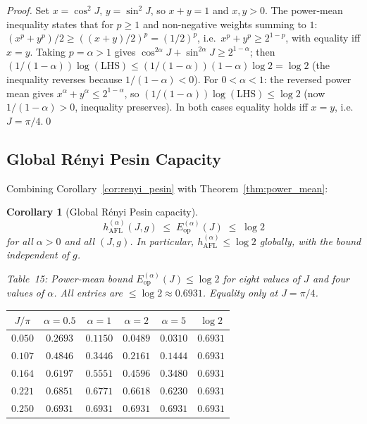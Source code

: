 \documentclass[12pt,a4paper]{article}
\newtheorem{corollary}[theorem]{Corollary}
\begin{document}
\begin{proof}
Set $x=\cos^2\!J$, $y=\sin^2\!J$, so $x+y=1$ and $x,y>0$.
The power-mean inequality states that for $p\ge 1$ and non-negative weights
summing to $1$:
$(x^p+y^p)/2 \ge ((x+y)/2)^p = (1/2)^p$, i.e.\ $x^p+y^p \ge 2^{1-p}$, with
equality iff $x=y$.  Taking $p=\alpha>1$ gives $\cos^{2\alpha}\!J+\sin^{2\alpha}\!J
\ge 2^{1-\alpha}$; then $(1/(1-\alpha))\log(\text{LHS}) \le (1/(1-\alpha))(1-\alpha)\log 2
= \log 2$ (the inequality reverses because $1/(1-\alpha)<0$).
For $0<\alpha<1$: the reversed power mean gives $x^\alpha+y^\alpha\le 2^{1-\alpha}$,
so $(1/(1-\alpha))\log(\text{LHS})\le\log 2$ (now $1/(1-\alpha)>0$, inequality preserves).
In both cases equality holds iff $x=y$, i.e.\ $J=\pi/4$.\qed
\end{proof}

\subsection{Global Rényi Pesin Capacity}

Combining Corollary~\ref{cor:renyi_pesin} with Theorem~\ref{thm:power_mean}:

\begin{corollary}[Global Rényi Pesin capacity]\label{cor:global_capacity}
\begin{equation}\label{eq:global_cap}
  \boxed{h^{(\alpha)}_\mathrm{AFL}(J,g)
  \;\le\; E^{(\alpha)}_\mathrm{op}(J) \;\le\; \log 2}
\end{equation}
for all $\alpha>0$ and all $(J,g)$.  In particular, $h^{(\alpha)}_\mathrm{AFL}\le\log 2$
globally, with the bound independent of $g$.
\end{corollary}

\noindent\textit{Table~15: Power-mean bound $E^{(\alpha)}_\mathrm{op}(J)\le\log 2$ for
eight values of $J$ and four values of $\alpha$.  All entries are $\le\log 2\approx 0.6931$.
Equality only at $J=\pi/4$.}

\begin{center}
\begin{tabular}{@{}cccccc@{}}
\toprule
$J/\pi$ & $\alpha=0.5$ & $\alpha=1$ & $\alpha=2$ & $\alpha=5$ & $\log 2$\\
\midrule
$0.050$ & $0.2693$ & $0.1150$ & $0.0489$ & $0.0310$ & $0.6931$\\
$0.107$ & $0.4846$ & $0.3446$ & $0.2161$ & $0.1444$ & $0.6931$\\
$0.164$ & $0.6197$ & $0.5551$ & $0.4596$ & $0.3480$ & $0.6931$\\
$0.221$ & $0.6851$ & $0.6771$ & $0.6618$ & $0.6230$ & $0.6931$\\
$\mathbf{0.250}$ & $\mathbf{0.6931}$ & $\mathbf{0.6931}$ & $\mathbf{0.6931}$ & $\mathbf{0.6931}$ & $\mathbf{0.6931}$\\
\bottomrule
\end{tabular}
\end{center}
\end{document}
